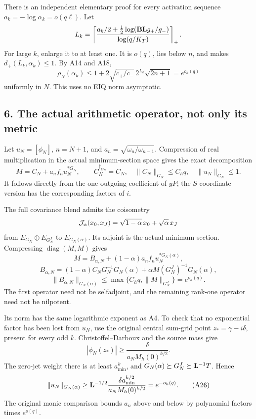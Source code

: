 \documentclass[11pt]{article}
\begin{document}
There is an independent elementary proof for every activation sequence \(a_k=-\log\alpha_k=o(q\ell)\). Let \[
 L_k=\left\lceil
 \frac{a_k/2+\tfrac12\log({\bf B}{\bf L}g_+/g_-)}
 {\log(q/K_T)}
 \right\rceil_+ .
\] For large \(k\), enlarge it to at least one. It is \(o(q)\), lies below \(n\), and makes \(d_+(L_k,\alpha_k)\le1\). By A14 and A18, \[
 \rho_N(\alpha_k)
 \le 1+2\sqrt{c_+/c_-}\,2^{L_k}\sqrt{2n+1}
 =e^{o_h(q)}
 \tag{A22}
\] uniformly in \(N\). This uses no EIQ norm asymptotic.

\subsection{6. The actual arithmetic operator, not only its metric}\label{the-actual-arithmetic-operator-not-only-its-metric}

Let \(u_N=[\phi_N]\), \(n=N+1\), and \(a_n=\sqrt{\omega_n/\omega_{n-1}}\). Compression of real multiplication in the actual minimum-section space gives the exact decomposition \[
 M=C_N+a_nf_nu_N^{*G_N},\qquad
 C_N^{\dagger_{G_N}}=C_N,\quad
 \|C_N\|_{G_N}\le C_hq,\quad \|u_N\|_{G_N}\le1.
 \tag{A23}
\] It follows directly from the one outgoing coefficient of \(yP\); the \(S\)-coordinate version has the corresponding factors of \(i\).

The full covariance blend admits the coisometry \[
 {\cal J}_\alpha(x_0,x_J)=\sqrt{1-\alpha}\,x_0+\sqrt\alpha\,x_J
\] from \(E_{G_N}\oplus E_{G_N^J}\) to \(E_{G_N(\alpha)}\). Its adjoint is the actual minimum section. Compressing \(\operatorname{diag}(M,M)\) gives \[
 M=B_{\alpha,N}
   +(1-\alpha)a_nf_nu_N^{*G_N(\alpha)},
 \tag{A24}
\] \[
 B_{\alpha,N}=(1-\alpha)C_NG_N^{-1}G_N(\alpha)
       +\alpha M(G_N^J)^{-1}G_N(\alpha),
\] \[
 \|B_{\alpha,N}\|_{G_N(\alpha)}
 \le\max\{C_hq,\|M\|_{G_N^J}\}=e^{o_h(q)}.
 \tag{A25}
\] The first operator need not be selfadjoint, and the remaining rank-one operator need not be nilpotent.

Its norm has the same logarithmic exponent as A4. To check that no exponential factor has been lost from \(u_N\), use the original central sum-grid point \(z_*=\gamma-i\delta\), present for every odd \(k\). Christoffel--Darboux and the source mass give \[
 |\phi_N(z_*)|
 \ge\frac{\delta}{a_NM_h(0)^{k/2}}.
\] The zero-jet weight there is at least \(a_{\min}^k\), and \(G_N(\alpha)\succeq G_N^J\succeq{\bf L}^{-1}T\). Hence \[
 \|u_N\|_{G_N(\alpha)}
 \ge {\bf L}^{-1/2}
      \frac{\delta a_{\min}^{k/2}}{a_NM_h(0)^{k/2}}
 =e^{-o_h(q)}.
 \tag{A26}
\] The original monic comparison bounds \(a_n\) above and below by polynomial factors times \(e^{o(q)}\).
\end{document}
